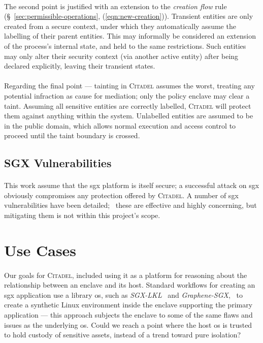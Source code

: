 \paragraph{} The second point is justified with an extension to the \textit{creation flow} rule (§~\ref{sec:permissible-operations}, (\ref{eqn:new-creation})). Transient entities are only created from a secure context, under which they automatically assume the labelling of their parent entities. This may informally be considered an extension of the process's internal state, and held to the same restrictions. Such entities may only alter their security context (via another active entity) after being declared explicitly, leaving their transient states. 

\paragraph{} Regarding the final point --- tainting in \textsc{Citadel} assumes the worst, treating any potential infraction as cause for mediation; only the policy enclave may clear a taint. Assuming all sensitive entities are correctly labelled, \textsc{Citadel} will protect them against anything within the system. Unlabelled entities are assumed to be in the public domain, which allows normal execution and access control to proceed until the taint boundary is crossed.

\subsection{SGX Vulnerabilities}
\label{sec:sgx-vulnerabilities}
\paragraph{} This work assume that the \acrshort{sgx} platform is itself secure; a successful attack on \acrshort{sgx} obviously compromises any protection offered by \textsc{Citadel}. A number of \acrshort{sgx} vulnerabilities have been detailed;~\cite{lipp2018meltdown, vanbulck2018foreshadow, Schwarz2019ZombieLoad, ridl, vanbulck2020lvi} these are effective and highly concerning, but mitigating them is not within this project's scope.

\section{Use Cases}

\paragraph{} Our goals for \textsc{Citadel}, included using it as a platform for reasoning about the relationship between an enclave and its host. Standard workflows for creating an \acrshort{sgx} application use a library \acrshort{os}, such as \textit{SGX-LKL}~\cite{priebe2019sgxlkl} and \textit{Graphene-SGX},~\cite{203255} to create a synthetic Linux environment inside the enclave supporting the primary application --- this approach subjects the enclave to some of the same flaws and issues as the underlying \acrshort{os}. Could we reach a point where the host \acrshort{os} is trusted to hold custody of sensitive assets, instead of a trend toward pure isolation?

